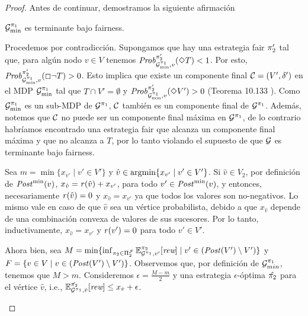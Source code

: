 \begin{proof}
  Antes de continuar, demostramos la siguiente afirmación
  \begin{claim}
    $\mathcal{G}^{\pi_{1}}_{\min}$ es terminante bajo fairness.
  \end{claim}
  \begin{proofofclaim}
    Procedemos por contradicción. Supongamos que hay una estrategia fair $\pi_{2}'$ tal que, para algún nodo $v \in V$ tenemos
    $\mathit{Prob}^{\pi_{2}'}_{\mathcal{G}_{\min}^{\pi_{1}},v}(\Diamond T) < 1$.
    Por esto,  $\mathit{Prob}^{\pi_{2}'}_{\mathcal{G}_{\min}^{\pi_{1}},v}(\Box \neg T) > 0$.
    Esto implica que existe un componente final $\mathcal{C} = (V',
    \delta')$ en el MDP $\mathcal{G}_{\min}^{\pi_{1}}$ tal que
    $T \cap V' = \emptyset$ y
    $\mathit{Prob}^{\pi_{2}'}_{\mathcal{G}_{\min}^{\pi_{1}},v}(\Diamond V') > 0$
    (Teorema 10.133 \cite[p.~889]{BaierK08}).
    Como $\mathcal{G}_{\min}^{\pi_{1}}$ es un sub-MDP de
    $\mathcal{G}^{\pi_{1}}$, $\mathcal{C}$ también es un componente final de
    $\mathcal{G}^{\pi_{1}}$.
    Además, notemos que $\mathcal{C}$ no puede ser un componente final máxima en
    $\mathcal{G}^{\pi_{1}}$, de lo contrario habríamos encontrado una estrategia fair que alcanza un componente final máxima y que no alcanza a $T$, por lo tanto
    violando el supuesto de que $\mathcal{G}$ es terminante bajo
    fairness.
    
    Sea $m = \min \{ x_{v'} \mid v' \in V' \}$ y
    $\hat{v} \in \operatorname*{argmin}  \{ x_{v'}  \mid v' \in V' \}$.
    Si $\hat{v}\in V_2$, por definición de $\mathit{Post}^{\min}(v)$,
    $x_{\hat{v}} = \mathit{r}(\hat{v}) + x_{v'}$, para todo
    $v' \in \mathit{Post}^{\min}(v)$, y entonces, necesariamente $\mathit{r}(\hat{v})=0$
    y $x_{\hat{v}} = x_{v'}$ ya que todos los valores son no-negativos.
    Lo mismo vale en caso de que $\hat{v}$ sea un vértice probabilista,
    debido a que $x_{\hat{v}}$ depende de una combinación convexa de valores de sus sucesores.
    Por lo tanto, inductivamente, $x_{\hat{v}} = x_{v'}$ y $\mathit{r}(v')=0$ para
    todo $v'\in V'$.

    Ahora bien, sea
    $M =  \min \{ \inf_{\pi_{2} \in \Pi^{\mathcal{F}}_{2}}  \mathbb{E}^{\pi_{2}}_{\mathcal{G}^{\pi_{1}},v'}[\textit{rew}] \mid v' \in (\mathit{Post}(V') \setminus V')\}$
    y 
    $F=\{v \in V \mid v \in (\mathit{Post}(V') \setminus V')\}$.
    Observemos que, por definición de $\mathcal{G}_{min}^{\pi_{1}}$, tenemos que $M > m$.
    Consideremos $\epsilon = \frac{M -m}{2}$ y una estrategia $\epsilon$-óptima
    $\hat{\pi_{2}}$ para el vértice $\hat{v}$, i.e.,
    $\mathbb{E}^{\hat{\pi_{2}}}_{\mathcal{G}^{\pi_{1}},\hat{v}}[\textit{rew}] \leq x_{\hat{v}} + \epsilon$.
    

\end{proofofclaim}
\end{proof}
